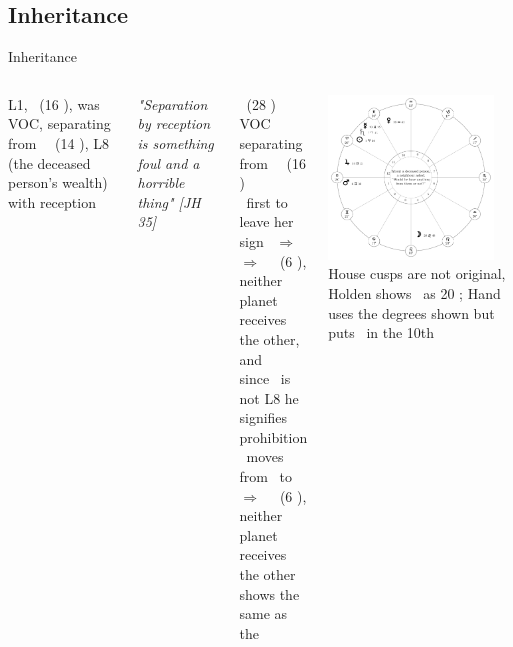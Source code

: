 \subsection{Inheritance}
\begin{frame}[t]{Inheritance}
\begin{columns}[T, onlytextwidth]
L1, \Venus\ (16 \Aquarius), was VOC, separating from \Square\  \Jupiter\ (14 \Taurus), L8 (the deceased person's wealth) with reception
\begin{block}{}
\textsl{"Separation by reception is something foul and a horrible thing" [JH 35]}
\end{block}
\Moon\ (28 \Leo) VOC separating from \Opposition\ \Venus\ (16 \Aquarius) \\
\Moon\ first to leave her sign \Leo\ $\Rightarrow$ \Virgo \\
$\Rightarrow$ \Trine\ \Mars\ (6 \Taurus), neither planet receives the other, and \\
since \Mars\ is not L8 he signifies prohibition \\
\vspace{0.25cm}
\Venus\ moves from \Aquarius\ to \Pisces \\
$\Rightarrow$ \Sextile\ \Mars\ (6 \Taurus), neither planet receives the other \\
shows the same as the \Moon

\begin{center}
{\includegraphics[width=0.9\textwidth]{charts/40-chart-inheritance}} \\
\small
House cusps are not original, Holden shows \Mercury\ as 20 \Pisces; Hand uses the degrees shown but puts \Mercury\ in the 10th
\end{center}
\end{columns}
\end{frame}